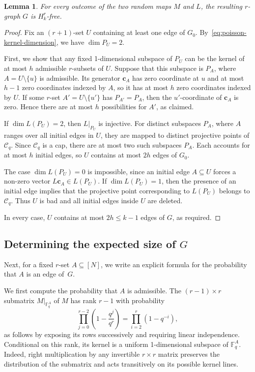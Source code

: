 \documentclass[12pt,a4paper]{article}
\numberwithin{equation}{section}
\newtheorem{lemma}[theorem]{Lemma}
\theoremstyle{definition}
\theoremstyle{remark}
\newcommand{\V}[1]{\boldsymbol{#1}}
\begin{document}
\begin{lemma}\label{lem:poisson-free}
	For every outcome of the two random maps $M$ and $L$, the resulting $r$-graph $G$ is $H_k^r$-free.
\end{lemma}

\begin{proof}
	Fix an $(r+1)$-set $U$ containing at least one edge of $G_0$. By~\eqref{eq:poisson-kernel-dimension}, we have $\dim P_U=2$.
	
	First, we show that any fixed 1-dimensional subspace of $P_U$ can be the kernel of at most $h$ admissible $r$-subsets of $U$. Suppose that this subspace is $P_A$, where $A=U\setminus\{u\}$ is admissible. Its generator $\V{c}_A$ has zero coordinate at $u$ and at most $h-1$ zero coordinates indexed by $A$, so it has at most $h$ zero coordinates indexed by $U$. If some $r$-set $A'=U\setminus\{u'\}$ has $P_{A'}=P_A$, then the $u'$-coordinate of $\V{c}_A$ is zero. Hence there are at most $h$ possibilities for $A'$, as claimed.
	
If $\dim L(P_U)=2$, then $L|_{P_U}$ is injective. 
For distinct subspaces $P_A$, where $A$ ranges over all initial edges in $U$,   they are mapped to distinct projective points of $\mathcal C_q$. 
Since $\mathcal C_q$ is a cap, there are at most two such subspaces $P_A$. Each accounts for at most $h$ initial edges, so $U$ contains at most $2h$ edges of $G_0$.
	
	The case $\dim L(P_U)=0$ is impossible, since an initial edge $A\subseteq U$ forces a non-zero vector $L\V{c}_A\in L(P_U)$. If $\dim L(P_U)=1$, then the presence of an initial edge implies that the projective point corresponding to $L(P_U)$ belongs to $\mathcal C_q$. Thus $U$ is bad and all initial edges inside $U$ are deleted. 
	
	
	In every case, $U$ contains at most $2h\le k-1$ edges of $G$, as required.
\end{proof}

\subsection{Determining the expected size of \texorpdfstring{$G$}{G}}

Next, for a fixed $r$-set $A\subseteq [N]$, we write an explicit formula for the probability that $A$ is an edge of~$G$.

We first compute the probability that $A$ is admissible. The $(r-1)\times r$ submatrix $M|_{\mathbb F_q^A}$ of $M$ has rank $r-1$ with probability
\[
\prod_{j=0}^{r-2}\left(1-\frac{q^{j}}{q^{r}}\right)=\prod_{i=2}^{r}(1-q^{-i}),
\]
as follows by exposing its rows successively and requiring linear independence. Conditional on this rank, its kernel is a uniform 1-dimensional subspace of $\mathbb F_q^A$. Indeed, right multiplication by any invertible $r\times r$ matrix preserves the distribution of the submatrix and acts transitively on its possible kernel lines.
\end{document}
